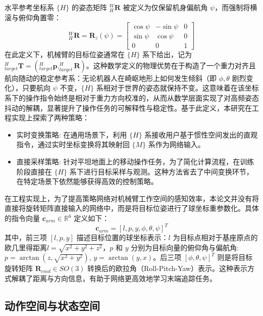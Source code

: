 水平参考坐标系 $\{H\}$ 的姿态矩阵 $_H^W\mathbf{R}$ 被定义为仅保留机身偏航角 $\psi$，而强制将横滚与俯仰角置零：
\begin{equation}
    _H^W \mathbf{R}= \mathbf{R}_z(\psi) = \begin{bmatrix}
        \cos\psi & -\sin\psi & 0 \\
        \sin\psi & \cos\psi  & 0 \\
        0        & 0         & 1
    \end{bmatrix}
\end{equation}
在此定义下，机械臂的目标位姿通常在 $\{H\}$ 系下给出，记为 $_{target}^H\mathbf{T} = (_{target}^H\mathbf{p}, _{target}^H\mathbf{R})$。这种数学定义的物理优势在于构造了一个重力对齐且航向随动的稳定参考系：无论机器人在崎岖地形上如何发生倾斜（即 $\phi, \theta$ 剧烈变化），只要航向 $\psi$ 不变，$\{H\}$ 系相对于世界的姿态就保持不变。这意味着在该坐标系下的操作指令始终是相对于重力方向校准的，从而从数学层面实现了对高频姿态抖动的解耦，显著提升了操作任务的可解释性与稳定性。基于此定义，本研究在工程实现上探索了两种策略：
\begin{itemize}
    \item 实时变换策略: 在通用场景下，利用 $\{H\}$ 系接收用户基于惯性空间发出的直观指令，通过实时坐标变换将其映射回 $\{M\}$ 系作为网络输入。
    \item 直接采样策略: 针对平坦地面上的移动操作任务，为了简化计算流程，在训练阶段直接在 $\{H\}$ 系下进行目标采样与观测。这种方法省去了中间变换环节，在特定场景下依然能够获得高效的控制策略。
\end{itemize}

在工程实现上，为了提高策略网络对机械臂工作空间的感知效率，本论文并没有将直接将旋转矩阵直接输入的网络中，而是将目标位姿进行了球坐标重参数化。具体的指令向量 $\mathbf{c}_{arm} \in \mathbb{R}^6$ 定义如下：
\begin{equation}
    \mathbf{c}_{arm} = [l, p, y, \phi, \theta, \psi]^T
\end{equation}
其中，前三项 $[l, p, y]$ 描述目标位置的球坐标表示：$l$ 为目标点相对于基座原点的欧几里得距离$l = \sqrt{x^2 + y^2 +z^2}$，$p$ 和 $y$ 分别为目标向量的俯仰角与偏航角:$p = \arctan(z, \sqrt{x^2+y^2})$, $y=\arctan(y, x)$。后三项 $[\phi, \theta, \psi]^T$ 则是将目标旋转矩阵 $\mathbf{R}_{cmd} \in SO(3)$ 转换后的欧拉角（Roll-Pitch-Yaw）表示。这种表示方式解耦了距离与方向信息，有助于网络更高效地学习末端追踪任务。


\subsection{动作空间与状态空间}

